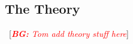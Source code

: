 \documentclass{article}
\newcommand{\bg}[1]{~{{[{\it \textcolor{red}{{\bf BG:} #1}}]}}}
\begin{document}
\subsection{The Theory}

\bg{Tom add theory stuff here}
%
%
%
%
\end{document}
